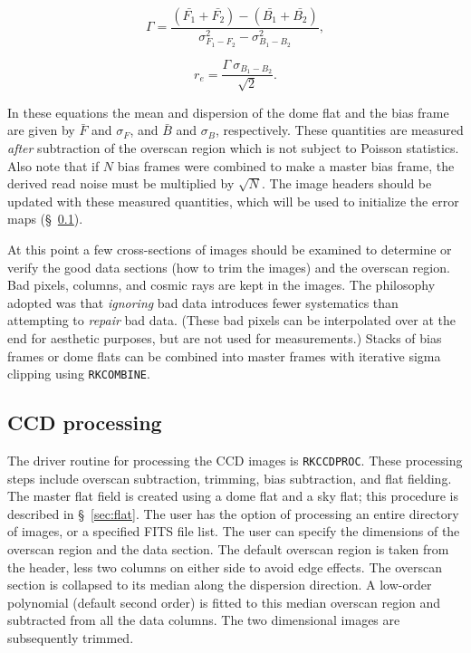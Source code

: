 \documentclass[12pt,preprint]{aastex}
\begin{document}
\begin{equation}
\Gamma = \frac{(\bar{F_{1}}+\bar{F_{2}}) -
(\bar{B_{1}}+\bar{B_{2}})} {\sigma^{2}_{F_{1}-F_{2}} -
\sigma^{2}_{B_{1}-B_{2}}},
\end{equation}

\begin{equation}
r_{e} = \frac{\Gamma \ \sigma_{B_{1}-B_{2}}}{\sqrt{2}}.
\end{equation}

\noindent In these equations the mean and dispersion of the dome flat
and the bias frame are given by $\bar{F}$ and $\sigma_{F}$, and
$\bar{B}$ and $\sigma_{B}$, respectively.  These quantities are
measured \emph{after} subtraction of the overscan region which is not
subject to Poisson statistics.  Also note that if $N$ bias frames were
combined to make a master bias frame, the derived read noise must be
multiplied by $\sqrt{N}$. 
The image headers should be updated with these measured quantities,
which will be used to initialize the error maps (\S~\ref{sec:proc}).

At this point a few cross-sections of images should be examined to
determine or verify the good data sections (how to trim the images)
and the overscan region.  Bad pixels, columns, and cosmic rays are
kept in the images.  The philosophy adopted was that \emph{ignoring}
bad data introduces fewer systematics than attempting to \emph{repair}
bad data.  (These bad pixels can be interpolated over at the end for
aesthetic purposes, but are not used for measurements.)  Stacks of
bias frames or dome flats can be combined into master frames with
iterative sigma clipping using {\tt RKCOMBINE}.

\subsection{CCD processing}\label{sec:proc}

The driver routine for processing the CCD images is {\tt RKCCDPROC}.
These processing steps include overscan subtraction, trimming, bias
subtraction, and flat fielding.  The master flat field is created
using a dome flat and a sky flat; this procedure is described in
\S~\ref{sec:flat}.  The user has the option of processing an entire
directory of images, or a specified FITS file list.  The user can
specify the dimensions of the overscan region and the data section.
The default overscan region is taken from the header, less two columns
on either side to avoid edge effects.  The overscan section is
collapsed to its median along the dispersion direction.  A low-order
polynomial (default second order) is fitted to this median overscan
region and subtracted from all the data columns.  The two dimensional
images are subsequently trimmed.
\end{document}
